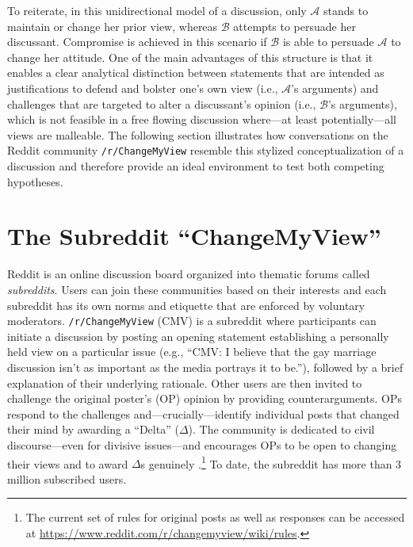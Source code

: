 To reiterate, in this unidirectional model of a discussion, only $\mathcal{A}$ stands to maintain or change her prior view, whereas $\mathcal{B}$ attempts to persuade her discussant. Compromise is achieved in this scenario if $\mathcal{B}$ is able to persuade $\mathcal{A}$ to change her attitude. One of the main advantages of this structure is that it enables a clear analytical distinction between statements that are intended as justifications to defend and bolster one's own view (i.e., $\mathcal{A}$'s arguments) and challenges that are targeted to alter a discussant's opinion (i.e., $\mathcal{B}$'s arguments), which is not feasible in a free flowing discussion where---at least potentially---all views are malleable. The following section illustrates how conversations on the Reddit community \texttt{/r/ChangeMyView} resemble this stylized conceptualization of a discussion and therefore provide an ideal environment to test both competing hypotheses.



\section{The Subreddit ``ChangeMyView''}

Reddit is an online discussion board organized into thematic forums called \textit{subreddits}. Users can join these communities based on their interests and each subreddit has its own norms and etiquette that are enforced by voluntary moderators. \texttt{/r/ChangeMyView} (CMV) is a subreddit where participants can initiate a discussion by posting an opening statement establishing a personally held view on a particular issue (e.g., ``CMV: I believe that the gay marriage discussion isn't as important as the media portrays it to be.''), followed by a brief explanation of their underlying rationale. Other users are then invited to challenge the original poster's (OP) opinion by providing counterarguments. OPs respond to the challenges and---crucially---identify individual posts that changed their mind by awarding a ``Delta'' ($\Delta$). The community is dedicated to civil discourse---even for divisive issues---and encourages OPs to be open to changing their views and to award $\Delta$s genuinely \citep[see also][]{jhaver2017designing}.\footnote{The current set of rules for original posts as well as responses can be accessed at \url{https://www.reddit.com/r/changemyview/wiki/rules}.} To date, the subreddit has more than 3 million subscribed users.

